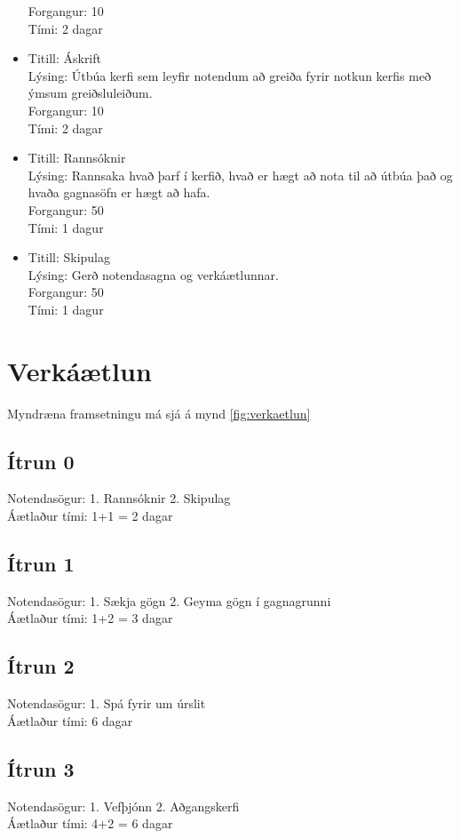 \documentclass[a4paper,11pt]{article}
\begin{document}
\begin{itemize}
  Forgangur: 10 \\
  Tími: 2 dagar\\
\item
  Titill: Áskrift\\
  Lýsing: Útbúa kerfi sem leyfir notendum að greiða fyrir notkun kerfis með ýmsum greiðsluleiðum. \\
  Forgangur: 10 \\
  Tími: 2 dagar\\
\item
  Titill: Rannsóknir\\
  Lýsing: Rannsaka hvað þarf í kerfið, hvað er hægt að nota til að útbúa það og hvaða gagnasöfn er hægt að hafa.\\
  Forgangur: 50\\
  Tími: 1 dagur\\
\item
  Titill: Skipulag\\
  Lýsing: Gerð notendasagna og verkáætlunnar.\\
  Forgangur: 50\\
  Tími: 1 dagur\\
\end{itemize}
\section{Verkáætlun}
Myndræna framsetningu má sjá á mynd \ref{fig:verkaetlun}
\subsection{Ítrun 0}
Notendasögur: 1. Rannsóknir 2. Skipulag\\
Áætlaður tími: 1+1 = 2 dagar
\subsection{Ítrun 1}
Notendasögur: 1. Sækja gögn 2. Geyma gögn í gagnagrunni\\
Áætlaður tími: 1+2 = 3 dagar

\subsection{Ítrun 2}
Notendasögur: 1. Spá fyrir um úrslit\\
Áætlaður tími: 6 dagar

\subsection{Ítrun 3}
Notendasögur: 1. Vefþjónn 2. Aðgangskerfi\\
Áætlaður tími: 4+2 = 6 dagar
\end{document}
